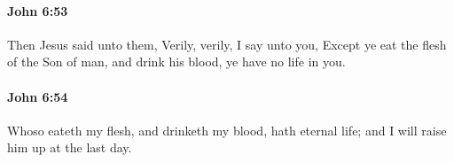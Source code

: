 		\paragraph{John 6:53} %
			\label{JOHN-6-53}

			Then Jesus said unto them, Verily, verily, I say unto you, Except ye eat the flesh of the Son of man, and drink his blood, ye have no life in you.

			\begin{framed}
			\scriptsize
				\begin{compactdesc}
					\item[SBLG] 
				\end{compactdesc}
			\end{framed}

		\paragraph{John 6:54} %
			\label{JOHN-6-54}

			Whoso eateth my flesh, and drinketh my blood, hath eternal life; and I will raise him up at the last day.

